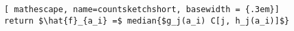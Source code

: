 \documentclass{beamer}
\begin{document}
\begin{frame}[fragile]
\begin{tcolorbox}[top=0pt, left=5pt,right=5pt, colback=blue!5!white, text height=0.5cm]
\vskip-0.1cm
\begin{lstlisting}[ mathescape, name=countsketchshort, basewidth = {.3em}]
return $\hat{f}_{a_i} =$ median{$g_j(a_i) C[j, h_j(a_i)]$}
\end{lstlisting}
\end{tcolorbox}
\end{frame}
\end{document}
